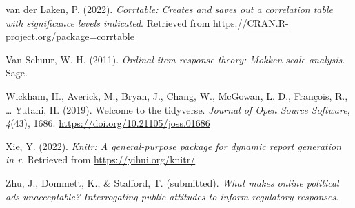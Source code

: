\documentclass[
  ,jou,floatsintext]{apa6}
\newlength{\cslhangindent}
\newlength{\cslentryspacingunit} %
\newenvironment{CSLReferences}[2] %
 {%
  \setlength{\parindent}{0pt}
  \ifodd #1
  \let\oldpar\par
  \def\par{\hangindent=\cslhangindent\oldpar}
  \fi
  \setlength{\parskip}{#2\cslentryspacingunit}
 }%
 {}
\begin{document}
\begin{CSLReferences}{1}{0}
\leavevmode{}%
van der Laken, P. (2022). \emph{Corrtable: Creates and saves out a correlation table with significance levels indicated}. Retrieved from \url{https://CRAN.R-project.org/package=corrtable}

\leavevmode{}%
Van Schuur, W. H. (2011). \emph{Ordinal item response theory: Mokken scale analysis}. Sage.

\leavevmode{}%
Wickham, H., Averick, M., Bryan, J., Chang, W., McGowan, L. D., François, R., \ldots{} Yutani, H. (2019). Welcome to the {tidyverse}. \emph{Journal of Open Source Software}, \emph{4}(43), 1686. \url{https://doi.org/10.21105/joss.01686}

\leavevmode{}%
Xie, Y. (2022). \emph{Knitr: A general-purpose package for dynamic report generation in r}. Retrieved from \url{https://yihui.org/knitr/}

\leavevmode{}%
Zhu, J., Dommett, K., \& Stafford, T. (submitted). \emph{What makes online political ads unacceptable? Interrogating public attitudes to inform regulatory responses}.

\end{CSLReferences}
\end{document}
